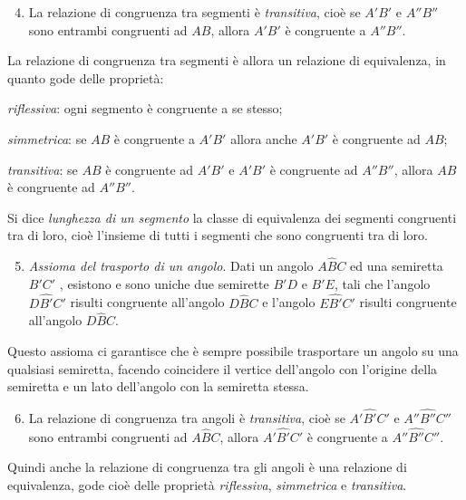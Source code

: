 \begin{enumerate}[label=\Roman{*}.]
\setcounter{enumi}{3}
\item La relazione di congruenza tra segmenti è \emph{transitiva}, cioè se $A'B'$ e $A''B''$ sono entrambi congruenti ad $AB$, allora $A'B'$ è congruente a $A''B''$.
\end{enumerate}
La relazione di congruenza tra segmenti è allora un relazione di equivalenza, in quanto gode delle proprietà:
\begin{enumeratea}
\item \emph{riflessiva}: ogni segmento è congruente a se stesso;
\item \emph{simmetrica}: se $AB$ è congruente a $A'B'$ allora anche $A'B'$ è congruente ad $AB$;
\item \emph{transitiva}: se $AB$ è congruente ad $A'B'$ e $A'B'$ è congruente ad $A''B''$, allora $AB$ è congruente ad $A''B''$.
\end{enumeratea}

\begin{definizione}
Si dice \emph{lunghezza di un segmento} la classe di equivalenza dei segmenti congruenti tra di loro, cioè l'insieme di tutti i segmenti che sono congruenti tra di loro.
\end{definizione}

\begin{enumerate}[label=\Roman{*}.]
\setcounter{enumi}{4}
\item \emph{Assioma del trasporto di un angolo}. Dati un angolo $A\widehat{B}C$ ed una semiretta $B'C'$ , esistono e sono uniche due semirette $B'D$ e $B'E$, tali che l'angolo $D\widehat{B'}C'$ risulti congruente all'angolo $D\widehat{B}C$ e l'angolo $E\widehat{B'}C'$ risulti congruente all'angolo $D\widehat{B}C$.
\end{enumerate}
Questo assioma ci garantisce che è sempre possibile trasportare un angolo su una qualsiasi semiretta, facendo coincidere il vertice dell'angolo con l'origine della semiretta e un lato dell'angolo con la semiretta stessa.

\begin{enumerate}[label=\Roman{*}.]
\setcounter{enumi}{5}
\item La relazione di congruenza tra angoli è \emph{transitiva}, cioè se $A'\widehat{B'}C'$ e $A''\widehat{B''}C''$ sono entrambi congruenti ad $A\widehat{B}C$, allora $A'\widehat{B'}C'$ è congruente a $A''\widehat{B''}C''$.
\end{enumerate}

Quindi anche la relazione di congruenza tra gli angoli è una relazione di equivalenza, gode cioè delle proprietà \emph{riflessiva}, \emph{simmetrica} e \emph{transitiva}.

